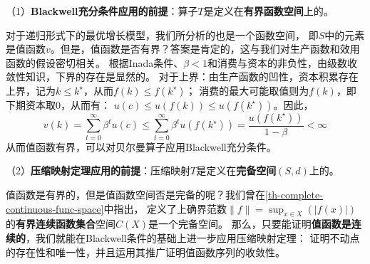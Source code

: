 （1）\textbf{Blackwell充分条件应用的前提}：算子$T$是定义在\textbf{有界函数空间}上的。

对于递归形式下的最优增长模型，我们所分析的也是一个函数空间，
即$S$中的元素是值函数$v$。但是，值函数是否有界？答案是肯定的，这与我们对生产函数和效用函数的假设密切相关。
根据Inada条件、$\beta < 1$和消费与资本的非负性，由级数收敛性知识，下界的存在是显然的。
对于上界：由生产函数的凹性，资本积累存在上界，记为$k \leq k^{\star}$，从而$f\left(k\right) \leq f\left(k^{\star}\right)$；
消费的最大可能取值则为$f\left(k\right)$，即下期资本取0，从而有：
$u\left(c\right)\leq u\left(f\left(k\right)\right)\leq u\left(f\left(k^{\star}\right)\right)$。因此，
\begin{equation*}
    v\left(k\right) = \sum_{t=0}^{\infty} \beta^t u\left(c\right) \leq 
        \sum_{t=0}^{\infty} \beta^t u\left(f\left(k^{\star}\right)\right) = 
            \frac{u\left(f\left(k^{\star}\right)\right)}{1-\beta} < \infty
\end{equation*}
从而值函数有界，可以对贝尔曼算子应用Blackwell充分条件。

（2）\textbf{压缩映射定理应用的前提}：压缩映射$T$是定义在\textbf{完备空间}$\left(S,d\right)$上的。

值函数是有界的，但是值函数空间否是完备的呢？我们曾在\cref{th-complete-continuous-func-space}中指出，
定义了上确界范数$\|f\|=\sup _{x \in X}(|f(x)|)$的\textbf{有界连续函数集合}空间$C\left(X\right)$是一个完备空间。
那么，只要能证明\textbf{值函数是连续的}，我们就能在Blackwell条件的基础上进一步应用压缩映射定理：
证明不动点的存在性和唯一性，并且运用其推广证明值函数序列的收敛性。